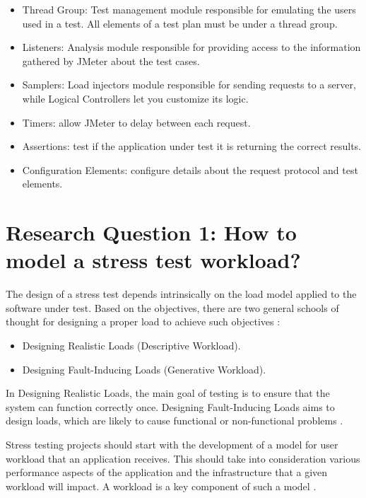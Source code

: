 \documentclass[espaco=umemeio,chapter=TITLE,twoside,openright]{abnt}
\begin{document}
\begin{itemize}
\item Thread Group: Test management module responsible for emulating the users used in a test. All elements of a test plan must be under a thread group.
\item Listeners: Analysis module responsible for providing access to the information gathered by JMeter about the test cases.
\item Samplers: Load injectors module responsible for sending requests to a server, while Logical Controllers let you customize its logic.
\item Timers: allow JMeter to delay between each request.
\item Assertions: test if the application under test it is returning the correct results.
\item Configuration Elements: configure details about the request protocol and test elements.
\end{itemize}


\FloatBarrier

\section{Research Question 1: How to  model a stress test workload?}


The design of a stress test depends intrinsically on the load model applied to the software under test. Based on the objectives, there are two general schools of thought for designing a proper load to achieve such objectives \cite{Afzal2009a}:

\begin{itemize}
\item Designing Realistic Loads (Descriptive Workload).
\item Designing Fault-Inducing Loads (Generative Workload).
\end{itemize}

In Designing Realistic Loads, the main goal of testing is to ensure that the system can function correctly once. Designing Fault-Inducing Loads aims to design loads, which are likely to cause functional or non-functional problems \cite{Afzal2009a}.

Stress testing projects should start with the development of a model for user workload that an application receives. This should take into consideration various performance aspects of the application and the infrastructure that a given workload will impact. A workload is a key component of such a model \cite{Molyneaux2009}.
\end{document}
